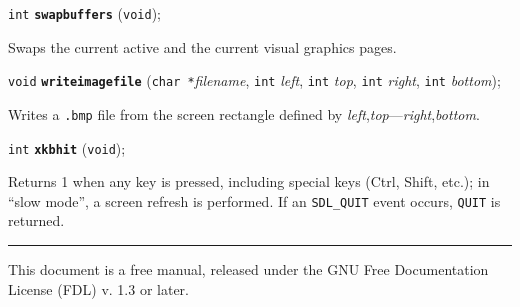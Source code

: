 \documentclass[a4paper,12pt]{article}
\newcommand{\V}{\texttt{void}}      %
\newcommand{\I}{\texttt{int}}       %
\newcommand{\C}{\texttt{char *}}    %
\newcommand{\func}[1]{\textbf{\texttt{#1}}}  %
\newcommand{\A}[1]{\emph{#1}}       %
\newcommand{\F}[1]{\texttt{#1}}     %
\newcommand{\T}[1]{\texttt{#1}}     %
\newenvironment{bgi}
{ %
  \begin{snugshade}
}
{ %
  \end{snugshade}
}
\begin{document}
\begin{bgi}
\I{} \func{swapbuffers} (\V{});
\end{bgi}

Swaps the current active and the current visual graphics pages.


\label{sec:writeimagefile}

\begin{bgi}
\V{} \func{writeimagefile} (\C{}\A{filename}, \I{} \A{left}, \I{}
\A{top}, \I{} \A{right}, \I{} \A{bottom});
\end{bgi}

Writes a \F{.bmp} file from the screen rectangle defined by
\A{left},\A{top}---\A{right},\A{bottom}.


\label{sec:xkbhit}

\begin{bgi}
\I{} \func{xkbhit} (\V{});
\end{bgi}

Returns 1 when any key is pressed, including special keys (Ctrl, Shift,
etc.); in ``slow mode'', a screen refresh is performed. If an
\T{SDL\_QUIT} event occurs, \T{QUIT} is returned.


\bigskip

\rule{\linewidth}{0.2pt}

This document is a free manual, released under the GNU Free
Documentation License (FDL) v. 1.3 or later.
\end{document}
